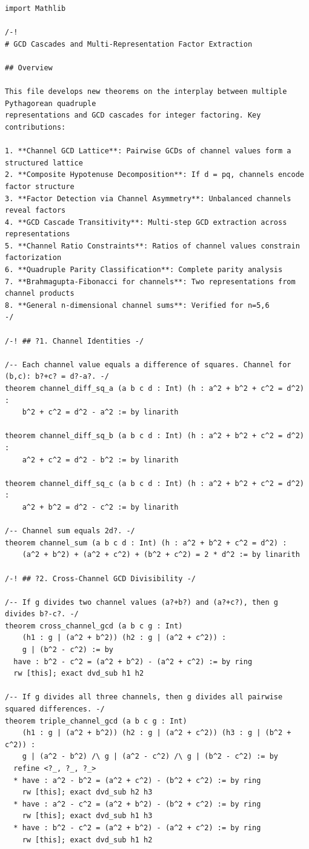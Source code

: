 \documentclass[11pt,twoside,openright]{book}
\theoremstyle{definition}
\theoremstyle{remark}
\begin{document}
\begin{lstlisting}[style=lean]
import Mathlib

/-!
# GCD Cascades and Multi-Representation Factor Extraction

## Overview

This file develops new theorems on the interplay between multiple Pythagorean quadruple
representations and GCD cascades for integer factoring. Key contributions:

1. **Channel GCD Lattice**: Pairwise GCDs of channel values form a structured lattice
2. **Composite Hypotenuse Decomposition**: If d = pq, channels encode factor structure
3. **Factor Detection via Channel Asymmetry**: Unbalanced channels reveal factors
4. **GCD Cascade Transitivity**: Multi-step GCD extraction across representations
5. **Channel Ratio Constraints**: Ratios of channel values constrain factorization
6. **Quadruple Parity Classification**: Complete parity analysis
7. **Brahmagupta-Fibonacci for channels**: Two representations from channel products
8. **General n-dimensional channel sums**: Verified for n=5,6
-/

/-! ## ?1. Channel Identities -/

/-- Each channel value equals a difference of squares. Channel for (b,c): b?+c? = d?-a?. -/
theorem channel_diff_sq_a (a b c d : Int) (h : a^2 + b^2 + c^2 = d^2) :
    b^2 + c^2 = d^2 - a^2 := by linarith

theorem channel_diff_sq_b (a b c d : Int) (h : a^2 + b^2 + c^2 = d^2) :
    a^2 + c^2 = d^2 - b^2 := by linarith

theorem channel_diff_sq_c (a b c d : Int) (h : a^2 + b^2 + c^2 = d^2) :
    a^2 + b^2 = d^2 - c^2 := by linarith

/-- Channel sum equals 2d?. -/
theorem channel_sum (a b c d : Int) (h : a^2 + b^2 + c^2 = d^2) :
    (a^2 + b^2) + (a^2 + c^2) + (b^2 + c^2) = 2 * d^2 := by linarith

/-! ## ?2. Cross-Channel GCD Divisibility -/

/-- If g divides two channel values (a?+b?) and (a?+c?), then g divides b?-c?. -/
theorem cross_channel_gcd (a b c g : Int)
    (h1 : g | (a^2 + b^2)) (h2 : g | (a^2 + c^2)) :
    g | (b^2 - c^2) := by
  have : b^2 - c^2 = (a^2 + b^2) - (a^2 + c^2) := by ring
  rw [this]; exact dvd_sub h1 h2

/-- If g divides all three channels, then g divides all pairwise squared differences. -/
theorem triple_channel_gcd (a b c g : Int)
    (h1 : g | (a^2 + b^2)) (h2 : g | (a^2 + c^2)) (h3 : g | (b^2 + c^2)) :
    g | (a^2 - b^2) /\ g | (a^2 - c^2) /\ g | (b^2 - c^2) := by
  refine <?_, ?_, ?_>
  * have : a^2 - b^2 = (a^2 + c^2) - (b^2 + c^2) := by ring
    rw [this]; exact dvd_sub h2 h3
  * have : a^2 - c^2 = (a^2 + b^2) - (b^2 + c^2) := by ring
    rw [this]; exact dvd_sub h1 h3
  * have : b^2 - c^2 = (a^2 + b^2) - (a^2 + c^2) := by ring
    rw [this]; exact dvd_sub h1 h2


\end{lstlisting}
\end{document}

